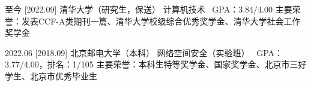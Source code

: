 \documentclass[zh]{resume}
\begin{document}
\makeheader

\begin{educations}
  \education%
    {至今}%
    [2022.09]%
    {清华大学（研究生，保送）}%
    {计算机技术 \textbullet \ GPA：3.84/4.00}%
    {}{主要荣誉：发表CCF-A类期刊一篇、清华大学校级综合优秀奖学金、清华大学社会工作奖学金}

  \separator{0.1ex}
  \education%
    {2022.06}%
    [2018.09]%
    {北京邮电大学（本科）}%
    {网络空间安全（实验班） \textbullet \ GPA：3.77/4.00，排名：1/105}%
    {}{主要荣誉：本科生特等奖学金、国家奖学金、北京市三好学生、北京市优秀毕业生}

\end{educations}
\end{document}
